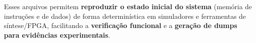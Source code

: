 \documentclass[12pt,a4paper]{article}
\begin{document}
Esses arquivos permitem \textbf{reproduzir o estado inicial do sistema} (memória de instruções e de dados) de forma determinística em simuladores e ferramentas de síntese/FPGA, facilitando a \textbf{verificação funcional} e a \textbf{geração de dumps para evidências experimentais}.




\end{document}
